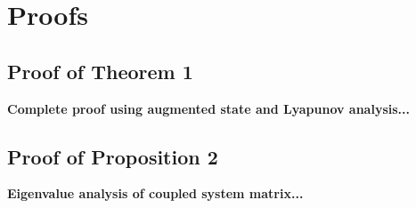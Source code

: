 \documentclass[12pt]{article}
\begin{document}
\appendix
\section{Proofs}
\label{app:proofs}

\subsection{Proof of Theorem 1}
\label{app:proof1}
\textbf{Complete proof using augmented state and Lyapunov analysis...}

\subsection{Proof of Proposition 2}
\label{app:proof2}
\textbf{Eigenvalue analysis of coupled system matrix...}



\end{document}

